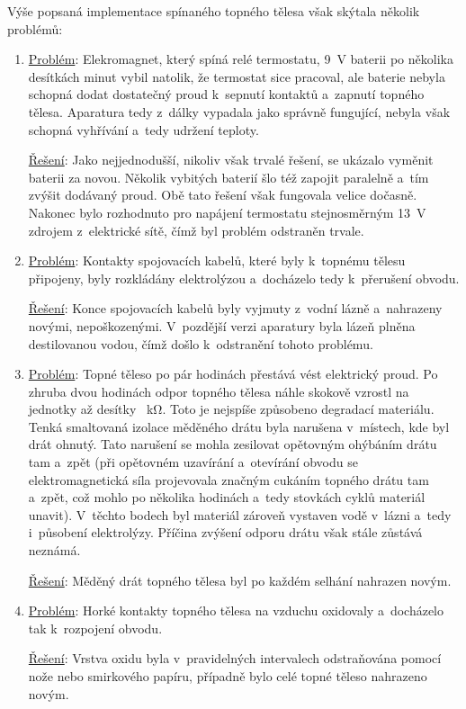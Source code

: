 \documentclass[12pt]{article}
\begin{document}
Výše popsaná implementace spínaného topného tělesa však skýtala několik problémů:
\begin{enumerate}[noitemsep, topsep = 0pt]
    \item \underline{Problém}: Elekromagnet, který spíná relé termostatu, \SI{9}{\volt} baterii po několika desítkách minut vybil natolik, že termostat sice pracoval, ale baterie nebyla schopná dodat dostatečný proud k~sepnutí kontaktů a~zapnutí topného tělesa. Aparatura tedy z~dálky vypadala jako správně fungující, nebyla však schopná vyhřívání a~tedy udržení teploty.
    \par \underline{Řešení}: Jako nejjednodušší, nikoliv však trvalé řešení, se ukázalo vyměnit baterii za novou. Několik vybitých baterií šlo též zapojit paralelně a~tím zvýšit dodávaný proud. Obě tato řešení však fungovala velice dočasně. Nakonec bylo rozhodnuto pro napájení termostatu stejnosměrným \SI{13}{\volt} zdrojem z~elektrické sítě, čímž byl problém odstraněn trvale.
    \item \underline{Problém}: Kontakty spojovacích kabelů, které byly k~topnému tělesu připojeny, byly rozkládány elektrolýzou a~docházelo tedy k~přerušení obvodu.
    \par \underline{Řešení}: Konce spojovacích kabelů byly vyjmuty z~vodní lázně a~nahrazeny novými, nepoškozenými. V~pozdější verzi aparatury byla lázeň plněna destilovanou vodou, čímž došlo k~odstranění tohoto problému.
    \item \underline{Problém}: Topné těleso po pár hodinách přestává vést elektrický proud. Po zhruba dvou hodinách odpor topného tělesa náhle skokově vzrostl na jednotky až desítky \SI{}{\kilo\ohm}. Toto je nejspíše způsobeno degradací materiálu. Tenká smaltovaná izolace měděného drátu byla narušena v~místech, kde byl drát ohnutý. Tato narušení se mohla zesilovat opětovným ohýbáním drátu tam a~zpět (při opětovném uzavírání a~otevírání obvodu se elektromagnetická síla projevovala značným cukáním topného drátu tam a~zpět, což mohlo po několika hodinách a~tedy stovkách cyklů materiál unavit). V~těchto bodech byl materiál zároveň vystaven vodě v~lázni a~tedy i~působení elektrolýzy. Příčina zvýšení odporu drátu však stále zůstává neznámá.
    \par \underline{Řešení}: Měděný drát topného tělesa byl po každém selhání nahrazen novým.
    \item \underline{Problém}: Horké kontakty topného tělesa na vzduchu oxidovaly a~docházelo tak k~rozpojení obvodu.
    \par \underline{Řešení}: Vrstva oxidu byla v~pravidelných intervalech odstraňována pomocí nože nebo smirkového papíru, případně bylo celé topné těleso nahrazeno novým.

\end{enumerate}
\end{document}
